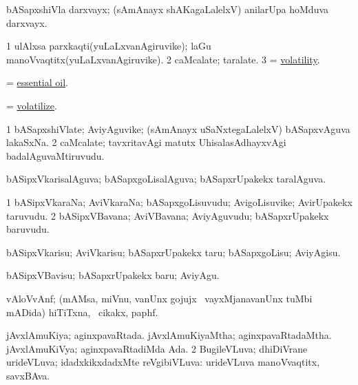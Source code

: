 \bentry
{} 
\gl{\nA}
\expl{}
\bmng
 bASapxshiVla darxvayx; (sAmAnayx shAKagaLalelxV) anilarUpa hoMduva darxvayx. 
\emng
\eentry

\bentry
{} 
\gl{\nA}
\expl{}
\bmng
\bnum
\num{1} ulAlxsa parxkaqti(yuLaLxvanAgiruvike); laGu manoVvaqtitx(yuLaLxvanAgiruvike). 
\num{2} caMcalate; taralate. 
\num{3} = \hyperlink{volatility}{volatility}. 
\enum
\emng
\eentry

\bentry 
{} 
\gl{\nA}
\expl{}
\bmng
 = \hyperref{kandict_e.pdf}{E}{essential oil}{essential oil}. 
\emng
\eentry

\bentry
{} 
\gl{\kirx}
\expl{}
\bmng
 = \hyperlink{volatilize}{volatilize}. 
\emng
\eentry

\bentry 
{} 
\gl{\nA}
\expl{}
\bmng
\bnum
\num{1} bASapxshiVlate; AviyAguvike; (sAmAnayx uSaNxtegaLalelxV) bASapxvAguva lakaSxNa. 
\num{2} caMcalate; tavxritavAgi matutx UhisalasAdhayxvAgi badalAguvaMtiruvudu. 
\enum
\emng
\eentry

\bentry
{} 
\gl{\gu}
\expl{}
\bmng
 bASipxVkarisalAguva; bASapxgoLisalAguva; bASapxrUpakekx taralAguva. 
\emng
\eentry

\bentry 
{} 
\gl{\nA}
\expl{}
\bmng
\bnum
\num{1} bASipxVkaraNa; AviVkaraNa; bASapxgoLisuvudu; AvigoLisuvike; AvirUpakekx taruvudu. 
\num{2} bASipxVBavana; AviVBavana; AviyAguvudu; bASapxrUpakekx baruvudu. 
\enum
\emng
\eentry

\bentry 
{} 
\gl{\sakirx}
\expl{}
\bmng
 bASipxVkarisu; AviVkarisu; bASapxrUpakekx taru; bASapxgoLisu; AviyAgisu. 
\emng

\noindent 
\gl{\akirx}
\expl{}
\bmng
 bASipxVBavisu; bASapxrUpakekx baru; AviyAgu. 
\emng
\eentry

\bentry 
{} 
\gl{\nA}
\expl{}
\bmng
 vAloVvAnf; (mAMsa, miVnu, \mo vanUnx gojujx \mo\ vayxMjanavanUnx tuMbi mADida) hiTiTxna, \sA\ cikakx, paphf. 
\emng
\eentry

\bentry
{} 
\gl{\gu}
\expl{}
\bmng
\bnum
{} 
\banum
{} jAvxlAmuKiya; aginxpavaRtada. 
 jAvxlAmuKiyaMtha; aginxpavaRtadaMtha. 
 jAvxlAmuKiVya; aginxpavaRtadiMda Ada. 
\eanum
\numie
\num{2} BugileVLuva; dhiDiVrane urideVLuva; idadxkikxdadxMte reVgibiVLuva:  urideVLuva manoVvaqtitx, savxBAva. 
\enum
\emng
\eentry

